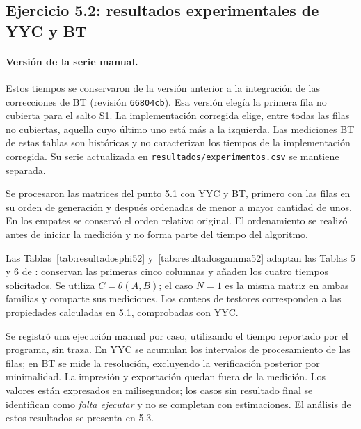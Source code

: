 \subsection{Ejercicio 5.2: resultados experimentales de YYC y BT}
\label{sec:ejercicio52}

\paragraph{Versión de la serie manual.}
Estos tiempos se conservaron de la versión anterior a la integración de
las correcciones de BT (revisión \texttt{66804cb}). Esa versión elegía
la primera fila no cubierta para el salto S1. La implementación corregida
elige, entre todas las filas no cubiertas, aquella cuyo último uno está
más a la izquierda. Las mediciones BT de estas tablas son históricas y
no caracterizan los tiempos de la implementación corregida. Su serie
actualizada en \texttt{resultados/experimentos.csv} se mantiene separada.

Se procesaron las matrices del punto 5.1 con YYC y BT, primero
con las filas en su orden de generación y después ordenadas de
menor a mayor cantidad de unos. En los empates se conservó el
orden relativo original. El ordenamiento se realizó antes de
iniciar la medición y no forma parte del tiempo del algoritmo.

Las Tablas~\ref{tab:resultadosphi52} y~\ref{tab:resultadosgamma52}
adaptan las Tablas 5 y 6 de \cite{alba2016}: conservan las primeras
cinco columnas y añaden los cuatro tiempos solicitados. Se utiliza
$C=\theta(A,B)$; el caso $N=1$ es la misma matriz en ambas familias
y comparte sus mediciones. Los conteos de testores corresponden
a las propiedades calculadas en 5.1, comprobadas con YYC.

Se registró una ejecución manual por caso, utilizando el tiempo
reportado por el programa, sin traza. En YYC se acumulan los
intervalos de procesamiento de las filas; en BT se mide la
resolución, excluyendo la verificación posterior por minimalidad.
La impresión y exportación quedan fuera de la medición. Los valores
están expresados en milisegundos; los casos sin resultado final
se identifican como \emph{falta ejecutar} y no se completan con
estimaciones. El análisis de estos resultados se presenta en 5.3.

\begin{table}[htbp]
\centering

\caption{Resultados manuales de YYC y BT sobre $\varphi^N(C)$,
en orden original y ascendente. Todos los tiempos están en ms.}
\label{tab:resultadosphi52}
\end{table}

